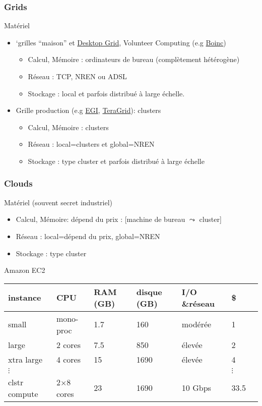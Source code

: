 \documentclass{beamer}
\newcommand{\Frownie}{{\textcolor{darkred}\frownie}}
\begin{document}
\begin{frame}
\frametitle{Grids}
  \begin{block}{Matériel}
    \begin{itemize}
    	\item<+->`grilles ``maison'' et \href{http://desktopgridfederation.org/}{Desktop Grid}, Volunteer Computing (e.g \href{http://www.boinc.org}{Boinc})
    	\begin{itemize}
		\item Calcul, Mémoire : ordinateurs de bureau (complètement hétérogène)
    		\item Réseau : TCP, NREN ou ADSL
		\item Stockage : local et parfois distribué à large échelle. 
    	\end{itemize}
	\item<+-> Grille production (e.g \href{http://www.egi.eu/}{EGI}, \href{http://www.teragrid.org}{TeraGrid}): clusters
    	\begin{itemize}
    		\item Calcul, Mémoire : clusters
    		\item Réseau : local=clusters et  global=NREN
		\item Stockage : type cluster et parfois distribué à large échelle
    	\end{itemize}
    \end{itemize}
  \end{block}
\hfill
\end{frame}


\begin{frame}
\frametitle{Clouds}
  \begin{block}{Matériel (\Frownie souvent secret industriel) }
    \begin{itemize}
		\item Calcul, Mémoire: dépend du prix : [machine de bureau $\leadsto$ cluster]  
    		\item Réseau : local=dépend du prix, global=NREN
		\item Stockage : type cluster 
    	\end{itemize}
\pause
	\begin{small}
	Amazon EC2
	\begin{tabular}{|l|l|l|l|l|l|l|}
		\hline
		instance		& CPU			& RAM (GB) & disque (GB) &  I/O \&réseau	& \$\\
		\hline
		\hline
		small			& mono-proc		 & 1.7		& 160		&  modérée 	& 1 \\
		large			& 2 cores		& 7.5		& 850		&  élevée  		& 2\\
		xtra large		& 4 cores		& 15		& 1690	&  élevée		& 4\\
		$\vdots$		&			&		&		&			& $\vdots$ \\
		clstr compute	& 2{$\times$}8 cores &23	& 1690	&  10 Gbps		& 33.5\\
		\hline
	\end{tabular}
	\end{small}

  \end{block}
\hfill
\end{frame}
\end{document}
